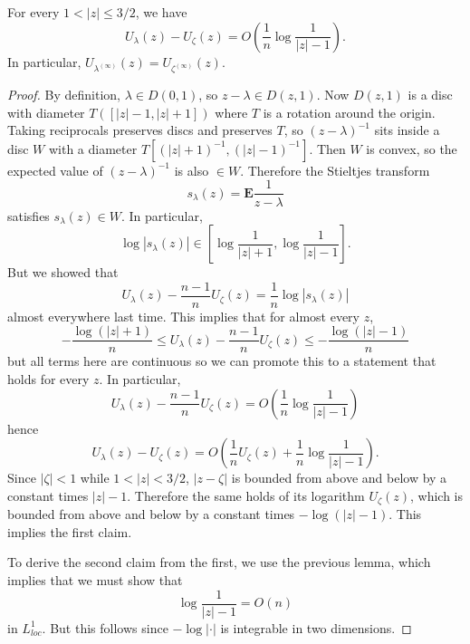 \documentclass[12pt]{article}
\begin{document}
\begin{lemma}
For every $1 < |z| \leq 3/2$, we have
$$U_\lambda(z) - U_\zeta(z) = O\left(\frac{1}{n} \log \frac{1}{|z| - 1}\right).$$
In particular, $U_{\lambda^{(\infty)}}(z) = U_{\zeta^{(\infty)}}(z)$.
\end{lemma}
\begin{proof}
By definition, $\lambda \in D(0, 1)$, so $z - \lambda \in D(z, 1)$.
Now $D(z, 1)$ is a disc with diameter $T([|z| - 1, |z| + 1])$ where $T$ is a rotation around the origin.
Taking reciprocals preserves discs and preserves $T$, so $(z - \lambda)^{-1}$ sits inside a disc $W$ with a diameter $T[(|z|+1)^{-1}, (|z|-1)^{-1}]$.
Then $W$ is convex, so the expected value of $(z - \lambda)^{-1}$ is also $\in W$.
Therefore the Stieltjes transform
$$s_\lambda(z) = \mathbf E \frac{1}{z - \lambda}$$
satisfies $s_\lambda(z) \in W$.
In particular,
$$\log |s_\lambda(z)| \in \left[\log \frac{1}{|z| + 1}, \log \frac{1}{|z| - 1}\right].$$
But we showed that
$$U_\lambda(z) - \frac{n - 1}{n} U_\zeta(z) = \frac{1}{n} \log |s_\lambda(z)|$$
almost everywhere last time.
This implies that for almost every $z$,
$$-\frac{\log(|z| + 1)}{n} \leq U_\lambda(z) - \frac{n - 1}{n}U_\zeta(z) \leq -\frac{\log(|z| - 1)}{n}$$
but all terms here are continuous so we can promote this to a statement that holds for every $z$.
In particular,
$$U_\lambda(z) - \frac{n - 1}{n} U_\zeta(z) = O\left(\frac{1}{n} \log \frac{1}{|z|-1}\right)$$
hence
$$U_\lambda(z) - U_\zeta(z) = O\left(\frac{1}{n} U_\zeta(z) + \frac{1}{n} \log \frac{1}{|z|-1}\right).$$
Since $|\zeta| < 1$ while $1 < |z| < 3/2$, $|z - \zeta|$ is bounded from above and below by a constant times $|z| - 1$. Therefore the same holds of its logarithm $U_\zeta(z)$, which is bounded from above and below by a constant times $-\log(|z| - 1)$. This implies the first claim.

To derive the second claim from the first, we use the previous lemma, which implies that we must show that
$$\log \frac{1}{|z| - 1} = O(n)$$
in $L^1_{loc}$. But this follows since $-\log|\cdot|$ is integrable in two dimensions.
\end{proof}
\end{document}
